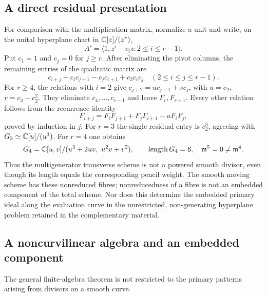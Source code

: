 \subsection{A direct residual presentation}
For comparison with the multiplication matrix, normalize a unit and
write, on the unital hyperplane chart in $\mathbb C[z]/(z^r)$,
\[
 A'=\langle1,z^i-c_i z:2\le i\le r-1\rangle.
\]
Put $c_1=1$ and $c_j=0$ for $j\ge r$. After eliminating the pivot
columns, the remaining entries of the quadratic matrix are
\begin{equation}\label{eq:hyperplane-residual-generators}
 c_{i+j}-c_i c_{j+1}-c_j c_{i+1}+c_2c_ic_j\quad(2\le i\le j\le r-1).
\end{equation}
For $r\ge4$, the relations with $i=2$ give
$c_{j+2}=u c_{j+1}+v c_j$, with $u=c_2$, $v=c_3-c_2^2$.
They eliminate $c_4,\ldots,c_{r-1}$ and leave $F_r,F_{r+1}$.
Every other relation follows from the recurrence identity
\[
 F_{i+j}=F_iF_{j+1}+F_jF_{i+1}-uF_iF_j,
\]
proved by induction in $j$. For $r=3$ the single residual entry is
$c_2^3$, agreeing with $G_3\simeq\mathbb C[u]/(u^3)$.
For $r=4$ one obtains
\[
 G_4=\C[u,v]/(u^3+2uv,\ u^2v+v^2),
 \qquad \operatorname{length}G_4=6,\quad\mathfrak m^5=0\ne\mathfrak m^4.
\]
Thus the multigenerator transverse scheme is not a powered smooth
divisor, even though its length equals the corresponding pencil
weight. The smooth moving scheme has these nonreduced fibres;
nonreducedness of a fibre is not an embedded component of the total
scheme. Nor does this determine the embedded primary ideal along
the evaluation curve in the unrestricted, non-generating hyperplane
problem retained in the complementary material.

\subsection{A noncurvilinear algebra and an embedded component}
The general finite-algebra theorem is not restricted to the primary
patterns arising from divisors on a smooth curve.

